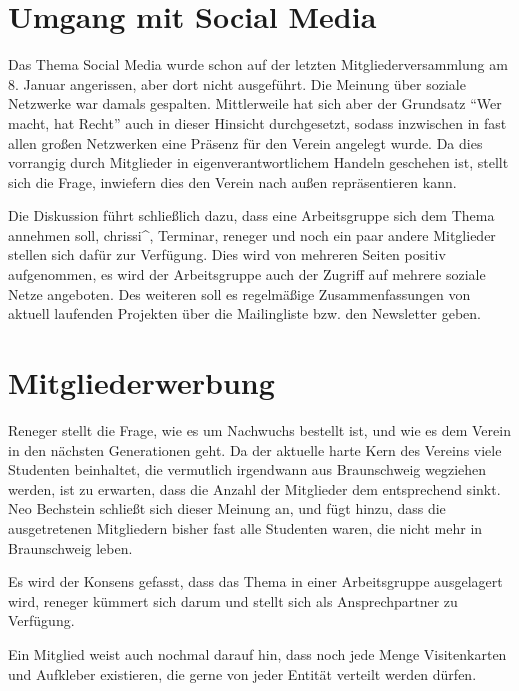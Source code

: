 \documentclass[a4paper,12pt]{scrartcl}
\begin{document}
\section{Umgang mit Social Media}\label{top:socialmedia}
Das Thema Social Media wurde schon auf der letzten Mitgliederversammlung am 8.
Januar angerissen, aber dort nicht ausgeführt. Die Meinung über soziale
Netzwerke war damals gespalten. Mittlerweile hat sich aber der Grundsatz "`Wer
macht, hat Recht"' auch in dieser Hinsicht durchgesetzt, sodass inzwischen in
fast allen großen Netzwerken eine Präsenz für den Verein angelegt wurde. Da dies
vorrangig durch Mitglieder in eigenverantwortlichem Handeln geschehen ist,
stellt sich die Frage, inwiefern dies den Verein nach außen repräsentieren
kann.

Die Diskussion führt schließlich dazu, dass eine Arbeitsgruppe sich dem Thema
annehmen soll, chrissi\textasciicircum, Terminar, reneger und noch ein paar
andere Mitglieder stellen sich dafür zur Verfügung. Dies wird von mehreren
Seiten positiv aufgenommen, es wird der Arbeitsgruppe auch der Zugriff auf
mehrere soziale Netze angeboten. Des weiteren soll es regelmäßige
Zusammenfassungen von aktuell laufenden Projekten über die Mailingliste bzw. den
Newsletter geben.

\section{Mitgliederwerbung}\label{top:mitgliederwerbung}
Reneger stellt die Frage, wie es um Nachwuchs bestellt ist, und wie es dem
Verein in den nächsten Generationen geht. Da der aktuelle harte Kern des Vereins
viele Studenten beinhaltet, die vermutlich irgendwann aus Braunschweig wegziehen
werden, ist zu erwarten, dass die Anzahl der Mitglieder dem entsprechend sinkt.
Neo Bechstein schließt sich dieser Meinung an, und fügt hinzu, dass die
ausgetretenen Mitgliedern bisher fast alle Studenten waren, die nicht mehr in
Braunschweig leben.

Es wird der Konsens gefasst, dass das Thema in einer Arbeitsgruppe ausgelagert
wird, reneger kümmert sich darum und stellt sich als Ansprechpartner zu
Verfügung.

Ein Mitglied weist auch nochmal darauf hin, dass noch jede Menge Visitenkarten
und Aufkleber existieren, die gerne von jeder Entität verteilt werden dürfen.
\end{document}
